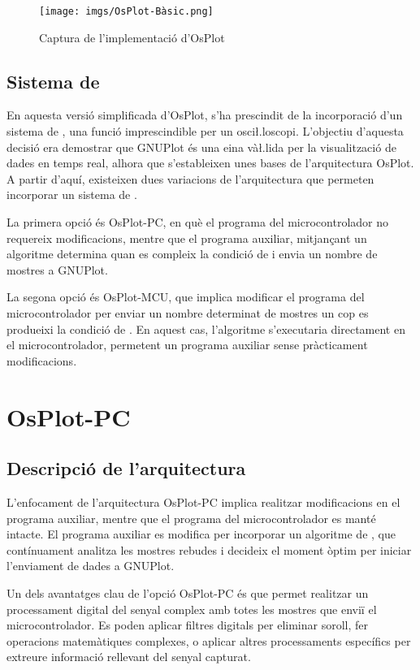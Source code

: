 \documentclass{tfgitic}[2023/06/30]
\begin{document}
\begin{figure}[h]
  \centering \texttt{[image: imgs/OsPlot-Bàsic.png]}
  \caption{Captura de l'implementació d'OsPlot}
\end{figure}

\subsection{Sistema de }

En aquesta versió simplificada d'OsPlot, s'ha prescindit de la
incorporació d'un sistema de , una funció imprescindible
per un osci\l.loscopi. L'objectiu d'aquesta decisió era demostrar que
GNUPlot és una eina và\l.lida per la visualització de dades en temps
real, alhora que s'estableixen unes bases de l'arquitectura OsPlot. A
partir d'aquí, existeixen dues variacions de l'arquitectura que
permeten incorporar un sistema de .

La primera opció és OsPlot-PC, en què el programa del microcontrolador
no requereix modificacions, mentre que el programa auxiliar,
mitjançant un algoritme determina quan es compleix la condició de
 i envia un nombre de mostres a GNUPlot.

La segona opció és OsPlot-MCU, que implica modificar el programa del
microcontrolador per enviar un nombre determinat de mostres un cop es
produeixi la condició de . En aquest cas, l'algoritme
s'executaria directament en el microcontrolador, permetent un programa
auxiliar sense pràcticament modificacions.

\section{OsPlot-PC}

\subsection{Descripció de l'arquitectura}

L'enfocament de l'arquitectura OsPlot-PC implica realitzar
modificacions en el programa auxiliar, mentre que el programa del
microcontrolador es manté intacte. El programa auxiliar es modifica
per incorporar un algoritme de , que contínuament
analitza les mostres rebudes i decideix el moment òptim per iniciar
l'enviament de dades a GNUPlot.

Un dels avantatges clau de l'opció OsPlot-PC és que permet realitzar
un processament digital del senyal complex amb totes les mostres que
enviï el microcontrolador. Es poden aplicar filtres digitals per
eliminar soroll, fer operacions matemàtiques complexes, o aplicar
altres processaments específics per extreure informació rellevant del
senyal capturat.
\end{document}
